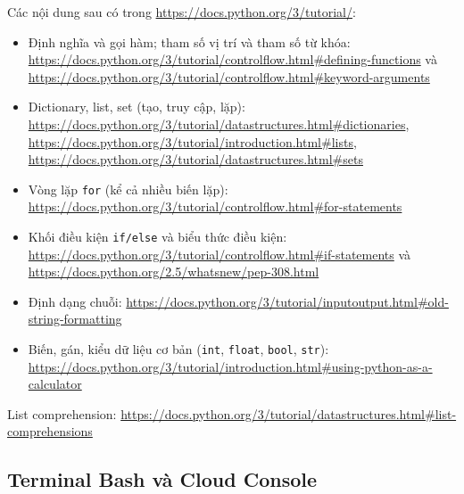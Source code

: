 \documentclass[12pt,a4paper]{article}
\newcommand{\mlccurl}[1]{\url{#1}}
\begin{document}
\begin{phuongphap}[title={Python cơ bản cần nắm}]
Các nội dung sau có trong \mlccurl{https://docs.python.org/3/tutorial/}:
\begin{itemize}
  \item Định nghĩa và gọi hàm; tham số vị trí và tham số từ khóa:
  \mlccurl{https://docs.python.org/3/tutorial/controlflow.html\#defining-functions}
  và \mlccurl{https://docs.python.org/3/tutorial/controlflow.html\#keyword-arguments}

  \item Dictionary, list, set (tạo, truy cập, lặp):
  \mlccurl{https://docs.python.org/3/tutorial/datastructures.html\#dictionaries},
  \mlccurl{https://docs.python.org/3/tutorial/introduction.html\#lists},
  \mlccurl{https://docs.python.org/3/tutorial/datastructures.html\#sets}

  \item Vòng lặp \texttt{for} (kể cả nhiều biến lặp):
  \mlccurl{https://docs.python.org/3/tutorial/controlflow.html\#for-statements}

  \item Khối điều kiện \texttt{if/else} và biểu thức điều kiện:
  \mlccurl{https://docs.python.org/3/tutorial/controlflow.html\#if-statements}
  và \mlccurl{https://docs.python.org/2.5/whatsnew/pep-308.html}

  \item Định dạng chuỗi:
  \mlccurl{https://docs.python.org/3/tutorial/inputoutput.html\#old-string-formatting}

  \item Biến, gán, kiểu dữ liệu cơ bản (\texttt{int}, \texttt{float}, \texttt{bool}, \texttt{str}):
  \mlccurl{https://docs.python.org/3/tutorial/introduction.html\#using-python-as-a-calculator}
\end{itemize}
\end{phuongphap}

\begin{luuy}[title={Một khái niệm Python nâng cao dùng trong vài bài tập}]
List comprehension:
\mlccurl{https://docs.python.org/3/tutorial/datastructures.html\#list-comprehensions}
\end{luuy}

\subsection{Terminal Bash và Cloud Console}
\end{document}

